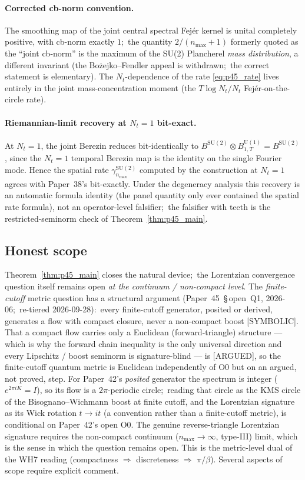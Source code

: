 \documentclass[11pt,a4paper]{article}
\theoremstyle{plain}
\theoremstyle{definition}
\newcommand{\nmax}{n_{\max}}
\newcommand{\Nt}{N_{t}}
\newcommand{\SU}{\mathrm{SU}}
\newcommand{\Uone}{\mathrm{U}(1)}
\begin{document}
\paragraph{Corrected cb-norm convention.}  The smoothing map of
the joint central spectral Fej\'er kernel is unital completely
positive, with cb-norm exactly $1$;\ the quantity $2/(\nmax+1)$
formerly quoted as the ``joint cb-norm'' is the maximum of the SU(2)
Plancherel \emph{mass distribution}, a different invariant (the
Bo\.zejko--Fendler appeal is withdrawn;\ the correct statement is
elementary).  The $\Nt$-dependence of the rate
\eqref{eq:p45_rate} lives entirely in the joint mass-concentration
moment (the $T\log\Nt/\Nt$ Fej\'er-on-the-circle rate).

\paragraph{Riemannian-limit recovery at $\Nt = 1$ bit-exact.}
At $\Nt = 1$, the joint Berezin reduces bit-identically to
$B^{\SU(2)} \otimes B^{\Uone}_{1,T} = B^{\SU(2)}$, since the
$\Nt = 1$ temporal Berezin map is the identity on the single Fourier
mode.  Hence the spatial rate $\gamma^{\SU(2)}_{\nmax}$ computed by the
construction at $\Nt = 1$ agrees with Paper~38's bit-exactly.  Under the
degeneracy analysis this recovery is an automatic formula identity
(the panel quantity only ever contained the spatial rate formula),
not an operator-level falsifier;\ the falsifier with teeth is the
restricted-seminorm check of Theorem~\ref{thm:p45_main}.

\subsection{Honest scope}

Theorem~\ref{thm:p45_main} closes the natural device;\ the
Lorentzian convergence question itself remains open \emph{at the
continuum / non-compact level}.  The \emph{finite-cutoff} metric
question has a structural argument (Paper~45~\S\,open~Q1,
2026-06;\ re-tiered 2026-09-28):\ every finite-cutoff generator, posited
or derived, generates a flow with compact closure, never a non-compact
boost [SYMBOLIC].  That a compact flow carries only a Euclidean
(forward-triangle) structure --- which is why the forward chain
inequality is the only universal direction and every Lipschitz / boost
seminorm is signature-blind --- is [ARGUED], so the finite-cutoff
quantum metric is Euclidean independently of O0 but on an argued, not
proved, step.  For Paper~42's \emph{posited} generator the spectrum is
integer ($e^{2\pi i K} = I$), so its flow is a $2\pi$-periodic circle;\
reading that circle as the KMS circle of the Bisognano--Wichmann boost at
finite cutoff, and the Lorentzian signature as its Wick
rotation $t \to it$ (a convention rather than a finite-cutoff metric), is
conditional on Paper~42's open O0.  The
genuine reverse-triangle Lorentzian signature requires the non-compact
continuum ($n_{\max} \to \infty$, type-III) limit, which is the sense in
which the question remains open.  This is the metric-level dual of the
WH7 reading (compactness $\Rightarrow$ discreteness $\Rightarrow$
$\pi/\beta$).  Several aspects of scope require explicit comment.
\end{document}
